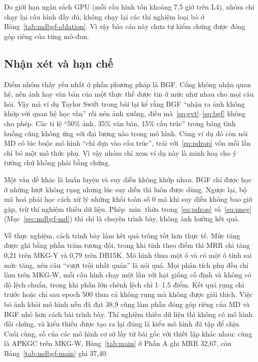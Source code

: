 \documentclass[conference,a4paper]{IEEEtran}
\begin{document}
Do giới hạn ngân sách GPU (mỗi cấu hình tốn khoảng 7{,}5 giờ trên L4), nhóm chỉ chạy lại cấu hình đầy đủ, không chạy lại các thí nghiệm loại bỏ ở Bảng~\ref{tab:mdbgf-ablation}. Vì vậy báo cáo này chưa tự kiểm chứng được đóng góp riêng của từng mô-đun.

\subsection{Nhận xét và hạn chế}
\label{sec:mdbgf-limits}

Điểm nhóm thấy yếu nhất ở phần phương pháp là BGF. Cổng không nhận quan hệ, nên ảnh hay văn bản của một thực thể được tin ở mức như nhau cho mọi câu hỏi. Vậy mà ví dụ Taylor Swift trong bài lại kể rằng BGF ``nhận ra ảnh không khớp với quan hệ học vấn'' rồi nén ảnh xuống, điều mà~\eqref{eq:gvt}--\eqref{eq:bgf} không cho phép. Các tỉ lệ ``50\% ảnh, 35\% văn bản, 15\% cấu trúc'' trong bảng tình huống cũng không ứng với đại lượng nào trong mô hình. Cùng ví dụ đó còn nói MD có lúc buộc mô hình ``chỉ dựa vào cấu trúc'', trái với~\eqref{eq:pdrop} vốn mỗi lần chỉ bỏ một mô thức phụ. Vì vậy nhóm chỉ xem ví dụ này là minh hoạ cho ý tưởng chứ không phải bằng chứng.

Một vấn đề khác là huấn luyện và suy diễn không khớp nhau. BGF chỉ được học ở những lượt không rụng nhưng lúc suy diễn thì luôn được dùng. Ngược lại, bộ mã hoá phải học cách xử lý những khối toàn số 0 mà khi suy diễn không bao giờ gặp, trừ thí nghiệm thiếu dữ liệu. Phép $\min$ thừa trong~\eqref{eq:pdrop} và~\eqref{eq:pneg} (Mục~\ref{sec:mdbgf-md}) thì chỉ là chuyện trình bày, không ảnh hưởng kết quả.

Về thực nghiệm, cách trình bày làm kết quả trông tốt hơn thực tế. Mức tăng được ghi bằng phần trăm tương đối, trong khi tính theo điểm thì MRR chỉ tăng 0{,}21 trên MKG-Y và 0{,}79 trên DB15K. Mô hình thua một ô và có một ô tính sai mức tăng, nên câu ``vượt trội nhất quán'' là nói quá. Mọi phân tích phụ đều chỉ làm trên MKG-W, mỗi cấu hình chạy một lần với hạt giống cố định và không có độ lệch chuẩn, trong khi phần lớn chênh lệch chỉ 1--1{,}5 điểm. Kết quả rụng chỉ trước hoặc chỉ sau epoch 500 thua cả không rụng mà không được giải thích. Việc bỏ ảnh khỏi mô hình nền đã đạt 38{,}9 cũng làm phần đóng góp riêng của MD và BGF nhỏ hơn cách bài trình bày. Thí nghiệm thiếu dữ liệu thì không có mô hình đối chứng, và kiểu thiếu được tạo ra lại đúng là kiểu mô hình đã tập để chịu. Cuối cùng, số của các mô hình cơ sở lấy từ bài gốc với thiết lập khác nhau: cùng là APKGC trên MKG-W, Bảng~\ref{tab:main} ở Phần A ghi MRR 32{,}67, còn Bảng~\ref{tab:mdbgf-main} ghi 37{,}40.
\end{document}
